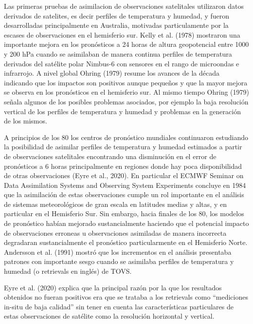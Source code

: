 \documentclass[12pt,oneside,a4paper]{reedthesis}
\begin{document}
Las primeras pruebas de asimilacion de observaciones satelitales utilizaron datos derivados de satelites, es decir perfiles de temperatura y humedad, y fueron desarrolladas principalmente en Australia, motivadas particulamente por la escases de observaciones en el hemisferio sur. Kelly et al. (1978) mostraron una importante mejora en los pronósticos a 24 horas de altura geopotencial entre 1000 y 200 hPa cuando se asimilaban de manera continua perfiles de temperatura derivados del satélite polar Nimbus-6 con sensores en el rango de microondas e infrarrojo. A nivel global Ohring (1979) resume los avances de la década indicando que los impactos son positivos aunque pequeños y que la mayor mejora se observa en los pronósticos en el hemisferio sur. Al mismo tiempo Ohring (1979) señala algunos de los posibles problemas asociados, por ejemplo la baja resolución vertical de los perfiles de temperatura y humedad y problemas en la generación de los mismos.

A principios de los 80 los centros de pronóstico mundiales continuaron estudiando la posibilidad de asimilar perfiles de temperatura y humedad estimados a partir de observaciones satelitales encontrando una disminución en el error de pronósticos a 6 horas principalmente en regiones donde hay poca disponibilidad de otras observaciones (Eyre et al., 2020). En particular el ECMWF Seminar on Data Assimilation Systems and Observing System Experiments concluye en 1984 que la asimilación de estas observaciones cumple un rol importante en el análisis de sistemas meteorológicos de gran escala en latitudes medias y altas, y en particular en el Hemisferio Sur. Sin embargo, hacia finales de los 80, los modelos de pronóstico habían mejorado sustancialmente haciendo que el potencial impacto de observaciones erroneas u observaciones asimiladas de manera incorrecta degradaran sustancialmente el pronóstico particularmente en el Hemisferio Norte. Andersson et al. (1991) mostró que los incrementos en el análisis presentaba patrones con importante sesgo cuando se asimilaba perfiles de temperatura y humedad (o retrievals en inglés) de TOVS.

Eyre et al. (2020) explica que la principal razón por la que los resultados obtenidos no fueran positivos era que se trataba a los retrievals como ``mediciones in-situ de baja calidad'' sin tener en cuenta las características particulares de estas observaciones de satélite como la resolución horizontal y vertical.
\end{document}
